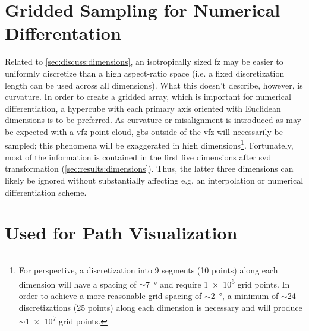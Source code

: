 \documentclass[preprint,12pt]{elsarticle}
\begin{document}
\section{Gridded Sampling for Numerical Differentation} \label{sec:supp:grid}
Related to \cref{sec:discuss:dimensions}, an isotropically sized \gls{fz} may be easier to uniformly discretize than a high aspect-ratio space (i.e. a fixed discretization length can be used across all dimensions). What this doesn't describe, however, is curvature. In order to create a gridded array, which is important for numerical differentiation, a hypercube with each primary axis oriented with Euclidean dimensions is to be preferred. As curvature or misalignment is introduced as may be expected with a \gls{vfz} point cloud, \glspl{gb} outside of the \gls{vfz} will necessarily be sampled; this phenomena will be exaggerated in high dimensions\footnote{For perspective, a discretization into 9 segments (10 points) along each dimension will have a spacing of $\sim$\SI{7}{\degree} and require \num{1e5} grid points. In order to achieve a more reasonable grid spacing of $\sim$\SI{2}{\degree}, a minimum of $\sim$\num{24} discretizations (25 points) along each dimension is necessary and will produce $\sim$\num{1e7} grid points. }. Fortunately, most of the information is contained in the first five dimensions after \gls{svd} transformation (\cref{sec:results:dimensions}). Thus, the latter three dimensions can likely be ignored without substantially affecting e.g. an interpolation or numerical differentiation scheme.

\section{ Used for Path Visualization} \label{sec:supp:sigma-key}

\begin{table}[!htb]
    \centering
    \caption{Minimum $\Sigma$ (Sigma) \glspl{gb} and corresponding IDs used for path visualization within the original \citet{olmstedSurveyComputedGrain2009} dataset. }
    \label{tab:sigma-key-olmsted}
\end{table}


\clearpage


\end{document}
